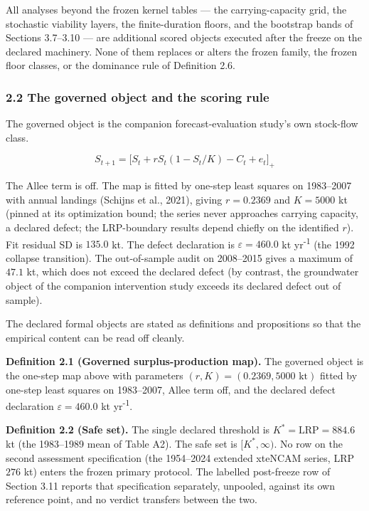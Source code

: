 \documentclass[11pt]{article}
\begin{document}
All analyses beyond the frozen kernel tables --- the carrying-capacity
grid, the stochastic viability layers, the finite-duration floors, and
the bootstrap bands of Sections 3.7--3.10 --- are additional scored
objects executed after the freeze on the declared machinery. None of
them replaces or alters the frozen family, the frozen floor classes, or
the dominance rule of Definition 2.6.

\subsubsection{2.2 The governed object and the scoring
rule}\label{the-governed-object-and-the-scoring-rule}

The governed object is the companion forecast-evaluation study's own
stock-flow class.

\[S_{t+1}=\bigl[S_t+rS_t(1-S_t/K)-C_t+e_t\bigr]_+\]

The Allee term is off. The map is fitted by one-step least squares on
1983--2007 with annual landings (Schijns et al., 2021), giving
\(r = 0.2369\) and \(K = 5000\) kt (pinned at its optimization bound;
the series never approaches carrying capacity, a declared defect; the
LRP-boundary results depend chiefly on the identified \(r\)). Fit
residual SD is \(135.0\) kt. The defect declaration is
\(\varepsilon = 460.0\) kt yr\textsuperscript{-1} (the 1992 collapse transition). The
out-of-sample audit on 2008--2015 gives a maximum of \(47.1\) kt, which
does not exceed the declared defect (by contrast, the groundwater object
of the companion intervention study exceeds its declared defect out of
sample).

The declared formal objects are stated as definitions and propositions
so that the empirical content can be read off cleanly.

\textbf{Definition 2.1 (Governed surplus-production map).} The governed
object is the one-step map above with parameters
\((r, K) = (0.2369, 5000\text{ kt})\) fitted by one-step least squares
on 1983--2007, Allee term off, and the declared defect declaration
\(\varepsilon = 460.0\) kt yr\textsuperscript{-1}.

\textbf{Definition 2.2 (Safe set).} The single declared threshold is
\(K^* = \mathrm{LRP} = 884.6\) kt (the 1983--1989 mean of Table A2). The
safe set is \([K^*, \infty)\). No row on the second assessment
specification (the 1954--2024 extended xteNCAM series, LRP \(276\) kt)
enters the frozen primary protocol. The labelled post-freeze row of
Section 3.11 reports that specification separately, unpooled, against
its own reference point, and no verdict transfers between the two.
\end{document}

